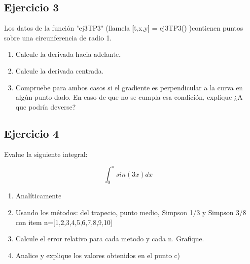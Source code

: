 \documentclass[a4paper,11pt]{article}
\theoremstyle{mytheor}
\begin{document}
\subsection*{Ejercicio 3} 

Los datos de la función "ej3TP3" (llamela [t,x,y] = ej3TP3() )contienen puntos sobre una circunferencia de radio 1.

\begin{enumerate}[label=\alph*)]
  \item Calcule la derivada hacia adelante.
  \item Calcule la derivada centrada.
  \item Compruebe para ambos casos si el gradiente es perpendicular a la curva en algún punto dado. En caso de que no se cumpla esa condición, explique ¿A que podría deverse?

\end{enumerate} 







\subsection*{Ejercicio 4} 

Evalue la siguiente integral:

\begin{equation*}
    \int_{0}^{\pi}sin(3x)dx
\end{equation*}

\begin{enumerate}[label=\alph*)]
    \item Analíticamente
    \item Usando los métodos: del trapecio, punto medio, Simpson 1/3 y Simpson 3/8 con item n=[1,2,3,4,5,6,7,8,9,10]
    \item Calcule el error relativo para cada metodo y cada n. Grafique.
    \item Analice y explique los valores obtenidos en el punto c)
\end{enumerate} 
\end{document}
